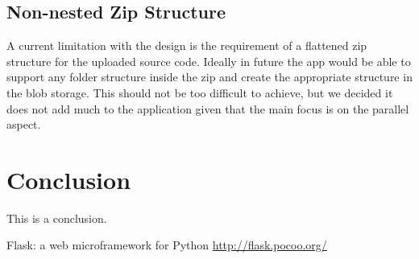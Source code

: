 \documentclass[conference]{IEEEtran}
\begin{document}
\subsection{Non-nested Zip Structure}
A current limitation with the design is the requirement of a flattened zip
structure for the uploaded source code. Ideally in future the app would be able
to support any folder structure inside the zip and create the appropriate
structure in the blob storage. This should not be too difficult to achieve, but
we decided it does not add much to the application given that the main focus is
on the parallel aspect.
\section{Conclusion}

This is a conclusion.

\begin{thebibliography}{00}
    Flask: a web microframework for Python
    \url{http://flask.pocoo.org/}
\end{thebibliography}
\end{document}
